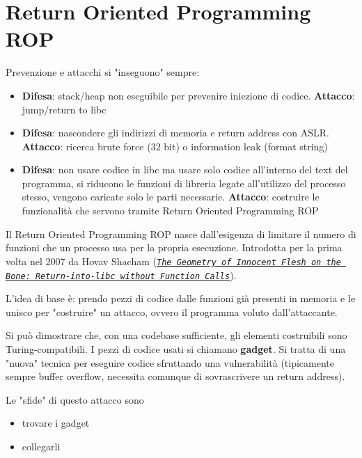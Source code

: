 \section{Return Oriented Programming ROP}
\label{sec:rop}

Prevenzione e attacchi si "inseguono" sempre:
\begin{itemize}
	\item \textbf{Difesa}: stack/heap non eseguibile per prevenire iniezione di codice. \textbf{Attacco}: jump/return to libc
    
	\item \textbf{Difesa}: nascondere gli indirizzi di memoria e return address con ASLR. \textbf{Attacco}: ricerca brute force (32 bit) o information leak (format string)
	
    \item \textbf{Difesa}: non usare codice in libc ma usare solo codice all'interno del text del programma, si riducono le funzioni di libreria legate all'utilizzo del processo stesso, vengono caricate solo le parti necessarie. \textbf{Attacco}: costruire le funzionalità che servono tramite Return Oriented Programming ROP
\end{itemize}

Il Return Oriented Programming ROP nasce dall'esigenza di limitare il numero di funzioni che un processo usa per la propria esecuzione. Introdotta per la prima volta nel 2007 da Hovav Shacham (\href{https://www.ush.it/team/ascii/geometry.pdf}{\textit{\texttt{The Geometry of Innocent Flesh on the Bone: Return-into-libc without Function Calls}}}).

L'idea di base è: prendo pezzi di codice dalle funzioni già presenti in memoria e le unisco per "costruire" un attacco, ovvero il programma voluto dall'attaccante. 

Si può dimostrare che, con una codebase sufficiente, gli elementi costruibili sono Turing-compatibili. I pezzi di codice usati si chiamano \textbf{gadget}. Si tratta di una "nuova" tecnica per eseguire codice sfruttando una vulnerabilità (tipicamente sempre buffer overflow, necessita comunque di sovrascrivere un return address).

Le "sfide" di questo attacco sono 
\begin{itemize}
	\item trovare i gadget
    
	\item collegarli
\end{itemize}

